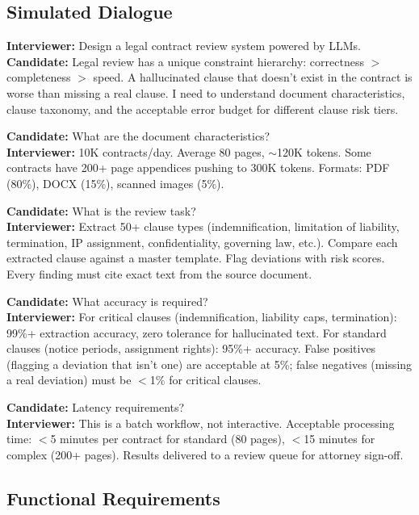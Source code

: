 \subsection*{Simulated Dialogue}

\textbf{Interviewer:} Design a legal contract review system powered by LLMs.\\
\textbf{Candidate:} Legal review has a unique constraint hierarchy: correctness $>$ completeness $>$ speed. A hallucinated clause that doesn't exist in the contract is worse than missing a real clause. I need to understand document characteristics, clause taxonomy, and the acceptable error budget for different clause risk tiers.

\textbf{Candidate:} What are the document characteristics?\\
\textbf{Interviewer:} 10K contracts/day. Average 80 pages, $\sim$120K tokens. Some contracts have 200+ page appendices pushing to 300K tokens. Formats: PDF (80\%), DOCX (15\%), scanned images (5\%).

\textbf{Candidate:} What is the review task?\\
\textbf{Interviewer:} Extract 50+ clause types (indemnification, limitation of liability, termination, IP assignment, confidentiality, governing law, etc.). Compare each extracted clause against a master template. Flag deviations with risk scores. Every finding must cite exact text from the source document.

\textbf{Candidate:} What accuracy is required?\\
\textbf{Interviewer:} For critical clauses (indemnification, liability caps, termination): 99\%+ extraction accuracy, zero tolerance for hallucinated text. For standard clauses (notice periods, assignment rights): 95\%+ accuracy. False positives (flagging a deviation that isn't one) are acceptable at 5\%; false negatives (missing a real deviation) must be $<$1\% for critical clauses.

\textbf{Candidate:} Latency requirements?\\
\textbf{Interviewer:} This is a batch workflow, not interactive. Acceptable processing time: $<$5 minutes per contract for standard (80 pages), $<$15 minutes for complex (200+ pages). Results delivered to a review queue for attorney sign-off.

\subsection*{Functional Requirements}

